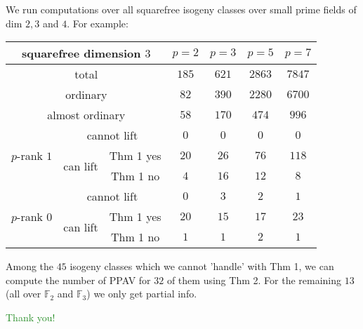 \documentclass[usenames,dvipsnames,handout]{beamer}
\def\F{\mathbb{F}}
\newcommand{\green}[1]{\textcolor{ForestGreen}{#1}}
\begin{document}
\begin{frame}
	We run computations over all squarefree isogeny classes over small prime fields of dim $2,3$ and $4$. 
	\pause For example:
	\begin{table}[ht]
	    \centering
	    \small
	    \begin{tabular}{|c|c|c|c|c|c|c|}\hline
	\multicolumn{3}{|c|}{squarefree dimension $3$}                  & $p=2$ & $p=3$ & $p=5$ & $p=7$ \\\hline
	\multicolumn{3}{|c|}{total}                                     & $185$ & $621$  & $2863$ & $7847$ \\\hline                    
	\multicolumn{3}{|c|}{ordinary}                                  & $82$ & $390$  & $2280$  & $6700$ \\\hline
	\multicolumn{3}{|c|}{almost ordinary}                           & $58$ & $170$  & $474$  & $996$  \\\hline
	\multirow{3}{*}{$p$-rank $1$} & \multicolumn{2}{|c|}{cannot lift}    & $0$ & $0$   & $0$   & $0$   \\\cline{2-7}
	                              & \multirow{2}{*}{can lift} & Thm 1 yes & $20$ & $26$   & $76$   & $118$   \\\cline{3-7}
	                              &                          & Thm 1 no  & $4$ & $16$   & $12$   & $8$   \\\hline
	\multirow{3}{*}{$p$-rank $0$}   & \multicolumn{2}{|c|}{cannot lift}    & $0$ & $3$   & $2$   & $1$   \\\cline{2-7}
	                              & \multirow{2}{*}{can lift} & Thm 1 yes & $20$ & $15$   & $17$   & $23$   \\\cline{3-7}
	                              &                          & Thm 1 no  & $1$ & $1$   & $2$   & $1$   \\\hline                              
	    \end{tabular}
	\end{table}
    \pause Among the $45$ isogeny classes which we cannot 'handle' with Thm 1, we can compute the number of PPAV for $32$ of them using Thm 2. For the remaining $13$ (all over $\F_2$ and $\F_3$) we only get partial info.
\end{frame}

\begin{frame}{  }
    \begin{center}
    \green{\huge Thank you!}
    \end{center}  
\end{frame}
\end{document}
